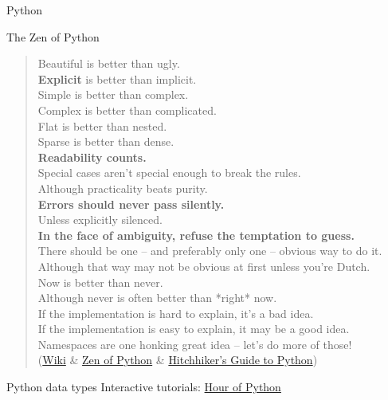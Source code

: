 \documentclass[10pt,a4paper]{article}
\begin{document}
\begin{multicols}{3}
\begin{textbox}{Python}

\end{textbox}

\begin{textbox}{The Zen of Python}

\begin{quote}\scriptsize
Beautiful is better than ugly. \\
\textbf{Explicit} is better than implicit. \\
Simple is better than complex. \\
Complex is better than complicated. \\
Flat is better than nested. \\
Sparse is better than dense. \\
\textbf{Readability counts.} \\
Special cases aren't special enough to break the rules.  \\
Although practicality beats purity. \\
\textbf{Errors should never pass silently.} \\
Unless explicitly silenced. \\
\textbf{In the face of ambiguity, refuse the temptation to guess.} \\
There should be one -- and preferably only one -- obvious way to do it. \\
Although that way may not be obvious at first unless you're Dutch. \\
Now is better than never. \\
Although never is often better than *right* now.\\
If the implementation is hard to explain, it's a bad idea. \\
If the implementation is easy to explain, it may be a good idea. \\
Namespaces are one honking great idea -- let's do more of those! \\
(\href{https://en.wikipedia.org/wiki/Zen_of_Python}{Wiki} \& \href{https://docs.python-guide.org/writing/style/#zen-of-python}{Zen of Python} \& \href{https://docs.python-guide.org/writing/style/#zen-of-python}{Hitchhiker's Guide to Python})
\end{quote}
\end{textbox}

\begin{textbox}{Python data types}
Interactive tutorials: \href{https://hourofpython.com/}{Hour of Python}


\end{textbox}
\end{multicols}
\end{document}
